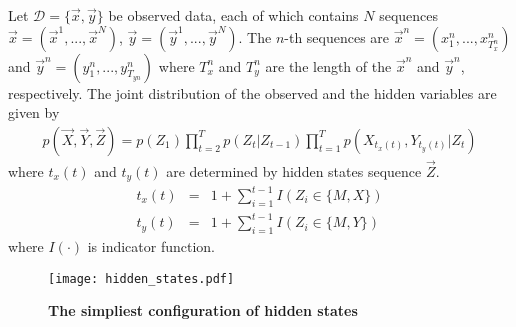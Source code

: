 Let $\mathcal{D}= \{\vec{x}, \vec{y} \}$ be observed data, each of which contains $N$ sequences $\vec{x} = (\vec{x}^1, ..., \vec{x}^N)$, $\vec{y} = (\vec{y}^1, ..., \vec{y}^N)$. The $n$-th sequences are $\vec{x}^n = (x^n_1, ..., x^n_{T^n_{x}})$ and $\vec{y}^n = (y^n_1, ..., y^n_{T_{yn}} )$ where $T_{x}^n$ and $T_{y}^n$ are the length of the $\vec{x}^n$ and $\vec{y}^n$, respectively. 
The joint distribution of the observed and the hidden variables are given by
\begin{eqnarray}
p(\vec{X}, \vec{Y}, \vec{Z}) = p(Z_{1}) \prod_{t=2}^{T} p(Z_t|Z_{t-1}) \prod_{t=1}^{T} p(X_{t_x(t)}, Y_{t_y(t)} | Z_t)
\end{eqnarray}
where $t_x(t)$ and $t_y(t)$ are determined by hidden states sequence $\vec{Z}$.
\begin{eqnarray}
  t_x(t) &=& 1 + \sum_{i=1}^{t-1} I(Z_i \in \{M, X\}) \\
  t_y(t) &=& 1 + \sum_{i=1}^{t-1} I(Z_i \in \{M, Y\})
\end{eqnarray}
where $I(\cdot)$ is indicator function.

\begin{figure}
  \centering
  \texttt{[image: hidden\_states.pdf]}
  \caption{{\bf The simpliest configuration of hidden states}}
  \label{fig:hidden_states}
\end{figure}


